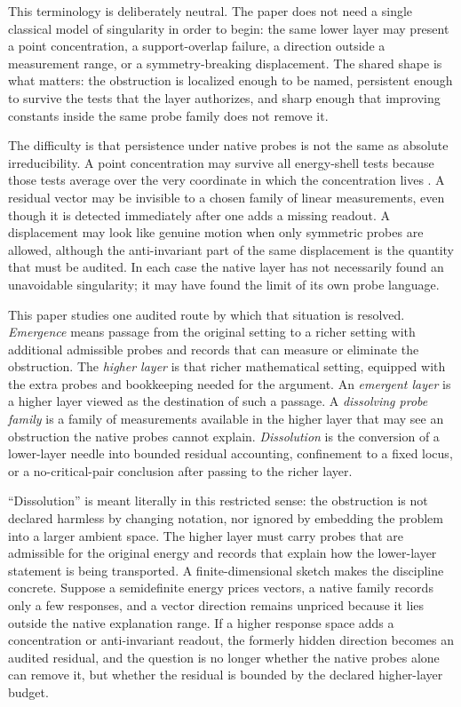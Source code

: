 \documentclass[11pt]{article}
\theoremstyle{definition}
\begin{document}
This terminology is deliberately neutral.  The paper does not need a
single classical model of singularity in order to begin: the same lower
layer may present a point concentration, a support-overlap failure, a
direction outside a measurement range, or a symmetry-breaking
displacement.  The shared shape is what matters: the obstruction is
localized enough to be named, persistent enough to survive the tests
that the layer authorizes, and sharp enough that improving constants
inside the same probe family does not remove it.

The difficulty is that persistence under native probes is not the same
as absolute irreducibility.  A point concentration may survive all
energy-shell tests because those tests average over the very coordinate
in which the concentration lives \citep{Lions1984ConcentrationI,Evans2010PartialDifferential}.  A residual vector may be invisible to
a chosen family of linear measurements, even though it is detected
immediately after one adds a missing readout.  A displacement may look
like genuine motion when only symmetric probes are allowed, although the
anti-invariant part of the same displacement is the quantity that must
be audited.  In each case the native layer has not necessarily found an
unavoidable singularity; it may have found the limit of its own probe
language.

This paper studies one audited route by which that situation is
resolved.  \emph{Emergence} means passage from the original setting to a
richer setting with additional admissible probes and records that can
measure or eliminate the obstruction.  The \emph{higher layer} is that
richer mathematical setting, equipped with the extra probes and
bookkeeping needed for the argument.  An \emph{emergent layer} is a
higher layer viewed as the destination of such a passage.  A
\emph{dissolving probe family} is a family of measurements available in
the higher layer that may see an obstruction the native probes cannot
explain.  \emph{Dissolution} is the conversion of a lower-layer needle
into bounded residual accounting, confinement to a fixed locus, or a
no-critical-pair conclusion after passing to the richer layer.

``Dissolution'' is meant literally in this restricted sense: the
obstruction is not declared harmless by changing notation, nor ignored
by embedding the problem into a larger ambient space.  The higher
layer must carry probes that are admissible for the original energy
and records that explain how the lower-layer statement is being
transported.  A finite-dimensional sketch makes the discipline
concrete.  Suppose a semidefinite energy prices vectors, a native
family records only a few responses, and a vector direction remains
unpriced because it lies outside the native explanation range.  If a
higher response space adds a concentration or anti-invariant readout,
the formerly hidden direction becomes an audited residual, and the
question is no longer whether the native probes alone can remove it,
but whether the residual is bounded by the declared higher-layer
budget.
\end{document}
